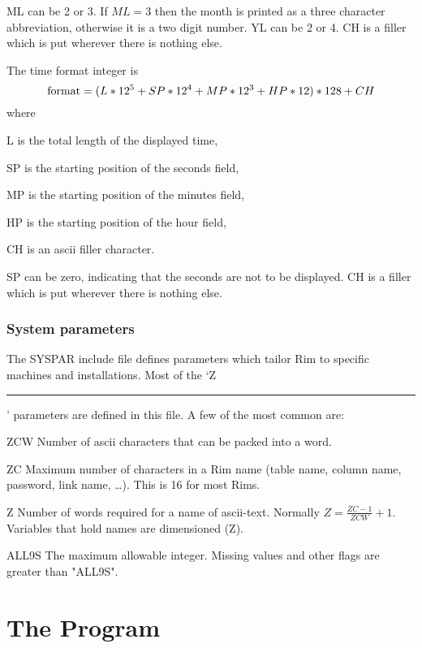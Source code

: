 \documentclass[11pt,a4paper]{report}
\begin{document}
ML can be 2 or 3.
If $ML=3$ then the month is printed as a three character abbreviation,
otherwise it is a two digit number.
YL can be 2 or 4.
CH is a filler which is put wherever there is nothing else.
 
The time format integer is
 \[\hbox{format}
      = (L*12^5 + SP*12^4 + MP*12^3 + HP*12)*128+CH\]
where
 
  \begin{List}
  \item[L] is the total length of the displayed time,
  \item[SP] is the starting position of the seconds field,
  \item[MP] is the starting position of the minutes field,
  \item[HP] is the starting position of the hour field,
  \item[CH] is an ascii filler character.
  \end{List}
 
SP can be zero, indicating that the seconds are not to be displayed.
CH is a filler which is put wherever there is nothing else.
 
 
\subsection{System parameters}
 
The SYSPAR include file defines parameters which tailor Rim to
specific machines and installations.   Most of the
`Z\rule{2pc}{.5pt}'
parameters are defined in this file. A few of the most
common are:
 
\begin{List}
\item[ZCW] Number of ascii characters that can be packed into a word.
\item[ZC] Maximum number of characters in a Rim name (table name,
  column name, password, link name, \ldots).  This is 16
  for most Rims.
\item[Z] Number of words required for a name of ascii-text.
Normally $Z=\frac{ZC-1}{ZCW}+1$.
Variables that hold names are dimensioned (Z).
 
\medskip
 
\item[ALL9S] The maximum allowable integer.  Missing values
    and other flags are greater than "ALL9S".
 
\end{List}
 
 
\chapter{The Program}
 
\end{document}
